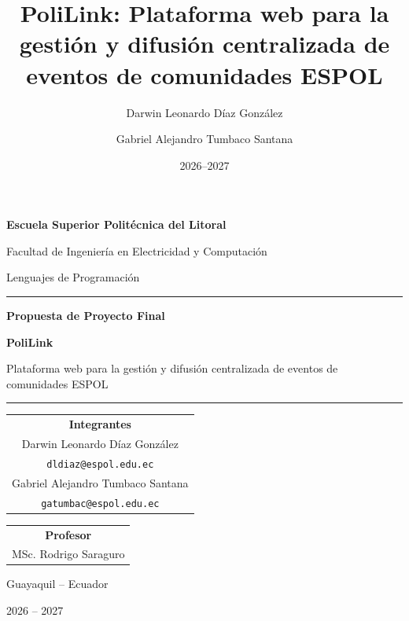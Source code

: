 \documentclass[12pt]{article}
\title{PoliLink: Plataforma web para la gestión y difusión centralizada de eventos de comunidades ESPOL}
\author{Darwin Leonardo Díaz González \and Gabriel Alejandro Tumbaco Santana}
\date{2026--2027}
\begin{document}
\begin{titlepage}
    \centering
    \vspace*{1.2cm}
    {\Large\bfseries Escuela Superior Politécnica del Litoral\par}
    \vspace{0.25cm}
    {\large Facultad de Ingeniería en Electricidad y Computación\par}
    \vspace{0.15cm}
    {\large Lenguajes de Programación\par}
    \vspace{1.4cm}
    \rule{0.72\textwidth}{0.8pt}\par
    \vspace{0.55cm}
    {\Large\bfseries Propuesta de Proyecto Final\par}
    \vspace{0.55cm}
    {\LARGE\bfseries PoliLink\par}
    \vspace{0.45cm}
    \begin{minipage}{0.76\textwidth}
        \centering
        \large Plataforma web para la gestión y difusión centralizada de eventos de comunidades ESPOL
    \end{minipage}\par
    \vspace{0.55cm}
    \rule{0.72\textwidth}{0.8pt}\par
    \vfill
    \begin{tabular}{c}
        \textbf{Integrantes} \\[0.25cm]
        Darwin Leonardo Díaz González \\
        \texttt{dldiaz@espol.edu.ec} \\[0.35cm]
        Gabriel Alejandro Tumbaco Santana \\
        \texttt{gatumbac@espol.edu.ec}
    \end{tabular}\par
    \vspace{1.1cm}
    \begin{tabular}{c}
        \textbf{Profesor} \\[0.2cm]
        MSc. Rodrigo Saraguro
    \end{tabular}\par
    \vfill
    {\large Guayaquil -- Ecuador\par}
    \vspace{0.12cm}
    {\large 2026 -- 2027\par}
    \vspace*{0.7cm}
\end{titlepage}
\end{document}
